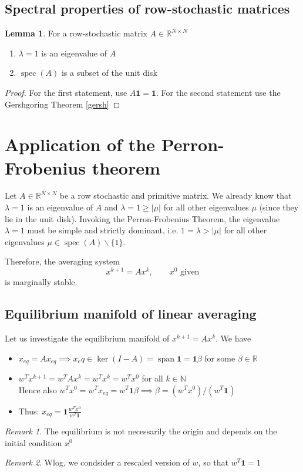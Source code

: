 \documentclass{book}
\DeclareMathOperator{\spec}{spec}
\DeclareMathOperator{\vspan}{span}
\newcommand{\R}{\mathbb{R}}
\newcommand{\N}{\mathbb{N}}
\theoremstyle{theoremv2}
\theoremstyle{defv2}
\theoremstyle{remark}
\newtheorem*{remark}{Remark}
\theoremstyle{remark}
\theoremstyle{definition}
\newtheorem*{lemma}{Lemma}
\theoremstyle{definition}
\begin{document}
\subsection{Spectral properties of row-stochastic matrices}
\begin{lemma}
    For a row-stochastic matrix $A\in\R^{N\times N}$
    \begin{enumerate}
        \item $\lambda = 1$ is an eigenvalue of $A$
        \item $\spec(A)$ is a subset of the unit disk
    \end{enumerate}
\end{lemma}
\begin{proof}[Proof]
    For the first statement, use $A\boldsymbol{1} = \boldsymbol{1}$. For the second statement use the Gershgoring Theorem \ref{gersh}
\end{proof}
\section{Application of the Perron-Frobenius theorem}
Let $A\in\R^{N\times N}$ be a row stochastic and primitive matrix. We already know that $\lambda=1$ is an eigenvalue of $A$ and $\lambda=1\geq |\mu|$ for all other eigenvalues $\mu$ (since they lie in the unit disk). Invoking the Perron-Frobenius Theorem, the eigenvalue $\lambda=1$ must be simple and strictly dominant, i.e. $1=\lambda>|\mu|$ for all other eigenvalues $\mu\in\spec(A)\backslash \{1\}$.

Therefore, the averaging system 
\[
    x^{k+1} = A x^k,\qquad x^0 \text{ given}
\]
is marginally stable. 
\subsection{Equilibrium manifold of linear averaging}
Let us investigate the equilibrium manifold of $x^{k+1} = Ax^k$. We have 
\begin{itemize}
    \item $x_{eq} = Ax_{eq} \implies x_eq\in\ker(I-A) = \vspan \boldsymbol{1} = \boldsymbol{1}\beta$ for some $\beta\in\R$
    \item $w^Tx^{k+1} = w^T Ax^k = w^Tx^k = w^Tx^0$ for all $k\in\N$
        \\ Hence also $w^Tx^0=w^Tx_{eq}=w^T\boldsymbol{1}\beta\implies \beta = (w^Tx^0)/(w^T\boldsymbol{1})$
    \item Thus: $x_{eq} = \boldsymbol{1} \displaystyle\frac{w^Tx^0}{w^T\boldsymbol{1}}$
\end{itemize}
\begin{remark}
    The equilibrium is not necessarily the origin and depends on the initial condition $x^0$
\end{remark}
\begin{remark}
    Wlog, we condsider a rescaled version of $w$, so that $w^T\boldsymbol{1}=1$
\end{remark}
\end{document}
